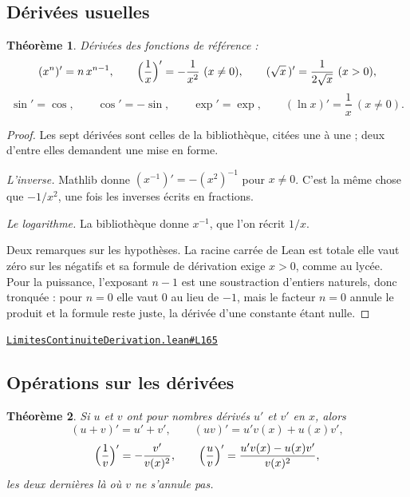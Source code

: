 \documentclass[11pt,a4paper]{article}
\theoremstyle{definition}
\theoremstyle{plain}
\newtheorem{theoreme}{Théorème}
\newcommand{\source}[2]{\par\smallskip\noindent\hfill{\footnotesize\href{#1}{\texttt{#2}}}\par\smallskip}
\begin{document}
\subsection{Dérivées usuelles}

\begin{theoreme}
Dérivées des fonctions de référence :
\[ (x^n)' = n\,x^{n-1}, \qquad
   \Bigl(\frac{1}{x}\Bigr)' = -\frac{1}{x^{2}} \ (x \ne 0), \qquad
   (\sqrt{x}\,)' = \frac{1}{2\sqrt{x}} \ (x > 0), \]
\[ \sin' = \cos, \qquad \cos' = -\sin, \qquad \exp' = \exp, \qquad
   (\ln x)' = \frac{1}{x} \ (x \ne 0). \]
\end{theoreme}

\begin{proof}
Les sept dérivées sont celles de la bibliothèque, citées une à une ; deux d'entre elles
demandent une mise en forme.

\smallskip\noindent
\emph{L'inverse.} Mathlib donne $(x^{-1})' = -(x^{2})^{-1}$ pour $x \ne 0$. C'est la même
chose que $-1/x^{2}$, une fois les inverses écrits en fractions.

\smallskip\noindent
\emph{Le logarithme.} La bibliothèque donne $x^{-1}$, que l'on récrit $1/x$.

\smallskip\noindent
Deux remarques sur les hypothèses. La racine carrée de Lean est totale \textemdash{} elle
vaut zéro sur les négatifs \textemdash{} et sa formule de dérivation exige $x > 0$, comme
au lycée. Pour la puissance, l'exposant $n - 1$ est une soustraction d'entiers naturels,
donc tronquée : pour $n = 0$ elle vaut $0$ au lieu de $-1$, mais le facteur $n = 0$ annule
le produit et la formule reste juste, la dérivée d'une constante étant nulle.
\end{proof}
\source{https://github.com/Commutator-IO/learn-lean/blob/main/cours/02-lycee/04-limites-continuite-derivation/LimitesContinuiteDerivation.lean\#L165}{LimitesContinuiteDerivation.lean\#L165}

\subsection{Opérations sur les dérivées}

\begin{theoreme}
Si $u$ et $v$ ont pour nombres dérivés $u'$ et $v'$ en $x$, alors
\[ (u + v)' = u' + v', \qquad (uv)' = u'v(x) + u(x)v', \]
\[ \Bigl(\frac{1}{v}\Bigr)' = -\frac{v'}{v(x)^{2}}, \qquad
   \Bigl(\frac{u}{v}\Bigr)' = \frac{u'v(x) - u(x)v'}{v(x)^{2}}, \]
les deux dernières là où $v$ ne s'annule pas.
\end{theoreme}
\end{document}
